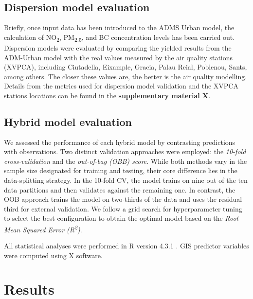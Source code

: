 \documentclass{article}
\begin{document}
\subsection{Dispersion model evaluation}
 Briefly, once input data has been introduced to the ADMS Urban model, the calculation of NO\textsubscript{2}, PM\textsubscript{2.5}, and BC concentration levels has been carried out. Dispersion models were evaluated by comparing the yielded results from the ADM-Urban model with the real values measured by the air quality stations (XVPCA), including Ciutadella, Eixample, Gracia, Palau Reial, Poblenou, Sants, among others. The closer these values are, the better is the air quality modelling.  Details from the metrics used for dispersion model validation and the XVPCA stations locations can be found in the \textbf{supplementary material X}.\vspace{0.5cm}

\subsection{Hybrid model evaluation}
We assessed the performance of each hybrid model by contrasting predictions with observations. Two distinct validation approaches were employed: the \textit{10-fold cross-validation} and the \textit{out-of-bag (OBB) score}. While both methods vary in the sample size designated for training and testing, their core difference lies in the data-splitting strategy. In the 10-fold CV, the model trains on nine out of the ten data partitions and then validates against the remaining one. In contrast, the OOB approach trains the model on two-thirds of the data and uses the residual third for external validation. We follow a grid search for hyperparameter tuning  to select the best configuration to obtain the optimal model based on the \textit{Root Mean Squared Error (R\textsuperscript{2})}. 

All statistical analyses were performed in R version 4.3.1 \cite{Rstudio}. GIS predictor variables were computed using X software. 

\section{Results}

\end{document}
